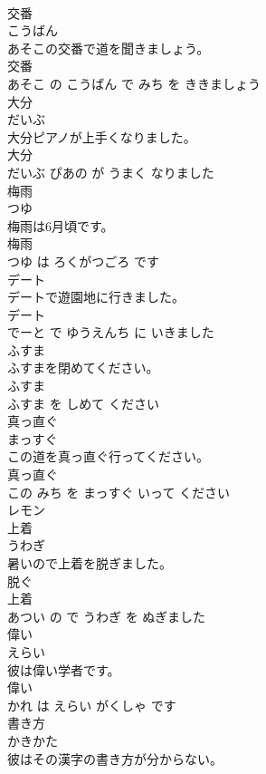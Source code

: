 \documentclass[8pt]{extreport}
\begin{document}
\begin{CJK}{UTF8}{min}
\\	交番	
\\	こうばん			
\\	あそこの交番で道を聞きましょう。	
\\	交番 
\\	あそこ の こうばん で みち を ききましょう			
\\	大分	
\\	だいぶ			
\\	大分ピアノが上手くなりました。	
\\	大分 
\\	だいぶ ぴあの が うまく なりました			
\\	梅雨	
\\	つゆ			
\\	梅雨は6月頃です。	
\\	梅雨 
\\	つゆ は ろくがつごろ です			
\\	デート	
\\	デートで遊園地に行きました。	
\\	デート 
\\	でーと で ゆうえんち に いきました			
\\	ふすま	
\\	ふすまを閉めてください。	
\\	ふすま 
\\	ふすま を しめて ください			
\\	真っ直ぐ	
\\	まっすぐ			
\\	この道を真っ直ぐ行ってください。	
\\	真っ直ぐ 
\\	この みち を まっすぐ いって ください			
\\	レモン	
\\	上着	
\\	うわぎ			
\\	暑いので上着を脱ぎました。	
\\	脱ぐ 
\\	上着 
\\	あつい の で うわぎ を ぬぎました			
\\	偉い	
\\	えらい			
\\	彼は偉い学者です。	
\\	偉い 
\\	かれ は えらい がくしゃ です			
\\	書き方	
\\	かきかた			
\\	彼はその漢字の書き方が分からない。	

\end{CJK}
\end{document}

